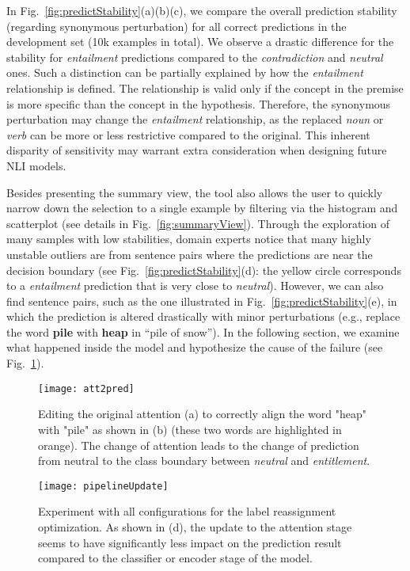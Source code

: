 In Fig.~\ref{fig:predictStability}(a)(b)(c), we compare the overall prediction stability (regarding synonymous perturbation) for all correct predictions in the development set (10k examples in total).
%
We observe a drastic difference for the stability for \emph{entailment} predictions compared to the \emph{contradiction} and \emph{neutral} ones.
%
Such a distinction can be partially explained by how the \emph{entailment} relationship is defined. The relationship is valid only if the concept in the premise is more specific than the concept in the hypothesis. Therefore, the synonymous perturbation may change the \emph{entailment} relationship, as the replaced \emph{noun} or \emph{verb} can be more or less restrictive compared to the original.
This inherent disparity of sensitivity may warrant extra consideration when designing future NLI models.

Besides presenting the summary view, the tool also allows the user to quickly narrow down the selection to a single example by filtering via the histogram and scatterplot (see details in Fig.~\ref{fig:summaryView}).
%
Through the exploration of many samples with low stabilities, domain experts notice that many highly unstable outliers are from sentence pairs where the predictions are near the decision boundary (see Fig.~\ref{fig:predictStability}(d): the yellow circle corresponds to a \emph{entailment} prediction that is very close to \emph{neutral}).
%
However, we can also find sentence pairs, such as the one illustrated in Fig.~\ref{fig:predictStability}(e), in which the prediction is altered drastically with minor perturbations (e.g., replace the word \textbf{pile} with \textbf{heap} in ``pile of snow''). In the following section, we examine what happened inside the model and hypothesize the cause of the failure (see Fig.~\ref{fig:att2pred}).

\begin{figure}[htbp]
\centering
\vspace{-2mm}
 \texttt{[image: att2pred]}
 \vspace{-6mm}
 \caption{
Editing the original attention (a) to correctly align the word "heap" with "pile" as shown in (b) (these two words are highlighted in orange).
The change of attention leads to the change of prediction from neutral to the class boundary between \emph{neutral} and \emph{entitlement}.
%
}
\label{fig:att2pred}
\end{figure}

\begin{figure*}[t]
\centering
\vspace{-2mm}
 \texttt{[image: pipelineUpdate]}
  \vspace{-6mm}
 \caption{
Experiment with all configurations for the label reassignment optimization. As shown in (d), the update to the attention stage seems to have significantly less impact on the prediction result compared to the classifier or encoder stage of the model.
 }
  \vspace{-4mm}
\label{fig:pipelineUpdate}
\end{figure*}

